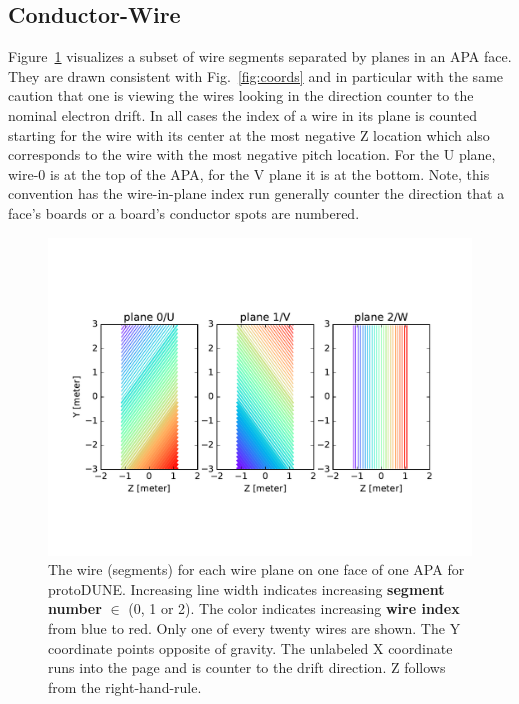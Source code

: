 \documentclass[pdftex,12pt,letter]{article}
\begin{document}
\subsection{Conductor-Wire}

Figure~\ref{fig:wires} visualizes a subset of wire segments separated
by planes in an APA face.  They are drawn consistent with
Fig.~\ref{fig:coords} and in particular with the same caution that one
is viewing the wires looking in the direction counter to the nominal
electron drift.  In all cases the index of a wire in its plane is
counted starting for the wire with its center at the most negative Z
location which also corresponds to the wire with the most negative
pitch location.  For the U plane, wire-0 is at the top of the APA, for
the V plane it is at the bottom.  Note, this convention has the
wire-in-plane index run generally counter the direction that a face's
boards or a board's conductor spots are numbered.  


\begin{figure}[htp]
  \centering
  \includegraphics[width=\textwidth,clip,trim=0 3cm 0 3cm]{wires-20.pdf}
  \caption{The wire (segments) for each wire plane on one face of one APA for protoDUNE.  Increasing line width indicates increasing \textbf{segment number} $\in$ (0, 1 or 2).  The color indicates increasing \textbf{wire index} from blue to red.  Only one of every twenty wires are shown. The Y coordinate points opposite of gravity.  The unlabeled X coordinate runs into the page and is counter to the drift direction.  Z follows from the right-hand-rule.}
  \label{fig:wires}
\end{figure}
\end{document}
